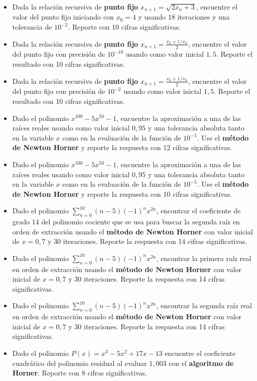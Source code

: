 \documentclass[12pt]{article}
\begin{document}
\begin{itemize}
\item Dada la relación recursiva de \textbf{punto fijo} \(x_{n+1}=\sqrt{2x_n+3}\), encuentre el valor del punto fijo iniciando con \(x_0=4\) y usando 18 iteraciones y una tolerancia de \(10^{-2}\). Reporte con 10 cifras significativas.
\item Dada la relación recursiva de \textbf{punto fijo} \(x_{n+1} = \frac{x_n + 1/x_n}{2}\), encuentre el valor del punto fijo con precisión de \(10^{-10}\) usando como valor inicial \(1{,}5\). Reporte el resultado con 10 cifras significativas.
\item Dada la relación recursiva de \textbf{punto fijo} \(x_{n+1} = \frac{x_n + 1/x_n}{2}\), encuentre el valor del punto fijo con precisión de \(10^{-2}\) usando como valor inicial \(1{,}5\). Reporte el resultado con 10 cifras significativas.
\item Dado el polinomio \(x^{100} - 5x^{50} -1\), encuentre la aproximación a una de las raíces reales usando como valor inicial \(0{,}95\) y una tolerancia absoluta tanto en la variable \(x\) como en la evaluación de la función de \(10^{-5}\). Use el \textbf{método de Newton Horner} y reporte la respuesta con 12 cifras significativas.
\item Dado el polinomio \(x^{100} - 5x^{50} -1\), encuentre la aproximación a una de las raíces reales usando como valor inicial \(0{,}95\) y una tolerancia absoluta tanto en la variable \(x\) como en la evaluación de la función de \(10^{-5}\). Use el \textbf{método de Newton Horner} y reporte la respuesta con 10 cifras significativas.
\item Dado el polinomio \(\sum\limits_{n=0}^{10}(n-5)(-1)^n x^{2n}\), encontrar el coeficiente de grado 14 del polinomio cociente que se usa para buscar la segunda raíz en orden de extracción  usando el \textbf{método de Newton Horner} con valor inicial de \(x=0{,}7\) y 30 iteraciones. Reporte la respuesta con 14 cifras significativas.
\item Dado el polinomio \(\sum\limits_{n=0}^{10}(n-5)(-1)^n x^{2n}\), encontrar la primera raíz real en orden de extracción usando el \textbf{método de Newton Horner} con valor inicial de \(x=0{,}7\) y 30 iteraciones. Reporte la respuesta con 14 cifras significativas.
\item Dado el polinomio \(\sum\limits_{n=0}^{10}(n-5)(-1)^n x^{2n}\), encontrar la segunda raíz real en orden de extracción usando el \textbf{método de Newton Horner} con valor inicial de \(x=0{,}7\) y 30 iteraciones. Reporte la respuesta con 14 cifras significativas.
\item Dado el polinomio \(P(x) = x^3 - 5x^2 + 17x -13\) encuentre el coeficiente cuadrático del polinomio residual al evaluar \(1{,}003\) con el \textbf{algoritmo de Horner}. Reporte con 8 cifras significativas.

\end{itemize}
\end{document}
